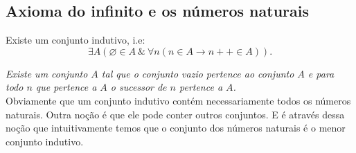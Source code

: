    \subsection{Axioma do infinito e os números naturais}
      \begin{stat}
         Existe um conjunto indutivo, i.e:
         $$\exists A\left(\varnothing \in A\ \&\ 
         \forall n(n \in A \rightarrow n ++ \in A)\right).$$
      \end{stat}
      \emph{Existe um conjunto $A$ tal que o conjunto vazio pertence ao 
         conjunto $A$ e para todo $n$ que pertence a $A$ o sucessor de $n$
      pertence a $A$.}\\
      Obviamente que um conjunto indutivo contém necessariamente todos os
      números naturais. Outra noção é que ele pode conter outros conjuntos. 
      E é através dessa noção que intuitivamente temos que o conjunto dos 
      números naturais é o menor conjunto indutivo.

